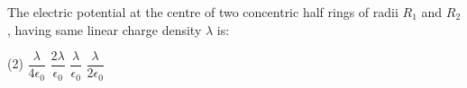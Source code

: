\item The electric potential at the centre of two concentric half rings of radii \( R_1 \) and \( R_2 \), having same linear charge density \( \lambda \) is:
    \begin{center}
    \end{center}
    \begin{tasks}(2)
        \task \(\dfrac{\lambda}{4 \epsilon_0}\)
        \task \(\dfrac{2\lambda}{\epsilon_0}\)
        \task \(\dfrac{\lambda}{\epsilon_0}\)
        \task \(\dfrac{\lambda}{2 \epsilon_0}\)
    \end{tasks}